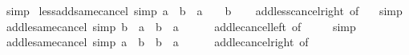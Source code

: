 \begin{isabellebody}
\ simp%
\endisatagproof
{\isafoldproof}%
%
\isadelimproof
\isanewline
%
\endisadelimproof
\isanewline
{}\isamarkupfalse%
\ less{\isacharunderscore}{\kern0pt}add{\isacharunderscore}{\kern0pt}same{\isacharunderscore}{\kern0pt}cancel{}\ {\isacharbrackleft}{\kern0pt}simp{\isacharbrackright}{\kern0pt}{\isacharcolon}{\kern0pt}\ {\isachardoublequoteopen}a\ {\isacharless}{\kern0pt}\ b\ {\isacharplus}{\kern0pt}\ a\ {\isasymlongleftrightarrow}\ {}\ {\isacharless}{\kern0pt}\ b{\isachardoublequoteclose}\isanewline
%
\isadelimproof
\ \ %
\endisadelimproof
%
\isatagproof
{}\isamarkupfalse%
\ add{\isacharunderscore}{\kern0pt}less{\isacharunderscore}{\kern0pt}cancel{\isacharunderscore}{\kern0pt}right\ {\isacharbrackleft}{\kern0pt}of\ {}{\isacharbrackright}{\kern0pt}\ \isamarkupfalse%
\ simp%
\endisatagproof
{\isafoldproof}%
%
\isadelimproof
\isanewline
%
\endisadelimproof
\isanewline
{}\isamarkupfalse%
\ add{\isacharunderscore}{\kern0pt}le{\isacharunderscore}{\kern0pt}same{\isacharunderscore}{\kern0pt}cancel{}\ {\isacharbrackleft}{\kern0pt}simp{\isacharbrackright}{\kern0pt}{\isacharcolon}{\kern0pt}\ {\isachardoublequoteopen}b\ {\isacharplus}{\kern0pt}\ a\ {\isasymle}\ b\ {\isasymlongleftrightarrow}\ a\ {\isasymle}\ {}{\isachardoublequoteclose}\isanewline
%
\isadelimproof
\ \ %
\endisadelimproof
%
\isatagproof
{}\isamarkupfalse%
\ add{\isacharunderscore}{\kern0pt}le{\isacharunderscore}{\kern0pt}cancel{\isacharunderscore}{\kern0pt}left\ {\isacharbrackleft}{\kern0pt}of\ {\isacharunderscore}{\kern0pt}\ {\isacharunderscore}{\kern0pt}\ {}{\isacharbrackright}{\kern0pt}\ \isamarkupfalse%
\ simp%
\endisatagproof
{\isafoldproof}%
%
\isadelimproof
\isanewline
%
\endisadelimproof
\isanewline
{}\isamarkupfalse%
\ add{\isacharunderscore}{\kern0pt}le{\isacharunderscore}{\kern0pt}same{\isacharunderscore}{\kern0pt}cancel{}\ {\isacharbrackleft}{\kern0pt}simp{\isacharbrackright}{\kern0pt}{\isacharcolon}{\kern0pt}\ {\isachardoublequoteopen}a\ {\isacharplus}{\kern0pt}\ b\ {\isasymle}\ b\ {\isasymlongleftrightarrow}\ a\ {\isasymle}\ {}{\isachardoublequoteclose}\isanewline
%
\isadelimproof
\ \ %
\endisadelimproof
%
\isatagproof
{}\isamarkupfalse%
\ add{\isacharunderscore}{\kern0pt}le{\isacharunderscore}{\kern0pt}cancel{\isacharunderscore}{\kern0pt}right\ {\isacharbrackleft}{\kern0pt}of\ {\isacharunderscore}{\kern0pt}\ {\isacharunderscore}{\kern0pt}\ {}{\isacharbrackright}{\kern0pt}\ \isamarkupfalse%

\end{isabellebody}

